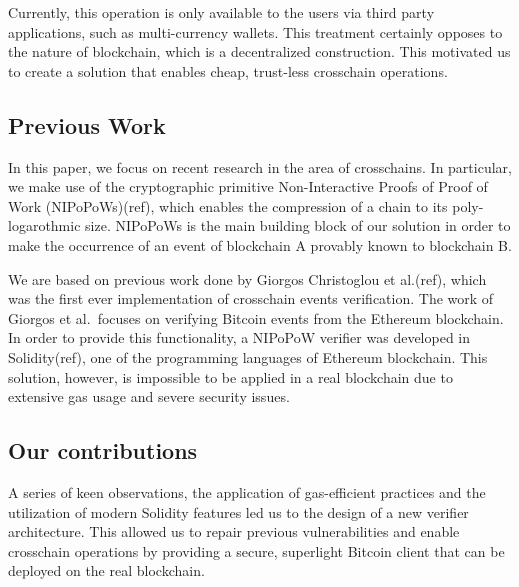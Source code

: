 Currently, this operation is only available to the users via third party
applications, such as multi-currency wallets. This treatment certainly
opposes to the nature of blockchain, which is a decentralized construction.
This motivated us to create a solution that enables cheap, trust-less
crosschain operations.

\subsection{Previous Work}

In this paper, we focus on recent research in the area of crosschains.
In particular, we make use of the cryptographic primitive
Non-Interactive Proofs of Proof of Work (NIPoPoWs)(ref), which enables
the compression of a chain to its poly-logarothmic size. NIPoPoWs is the
main building block of our solution in order to make the occurrence of
an event of blockchain A provably known to blockchain B.

We are based on previous work done by Giorgos Christoglou et al.(ref),
which was the first ever implementation of crosschain events
verification. The work of Giorgos et al.\ focuses on verifying Bitcoin
events from the Ethereum blockchain. In order to provide this
functionality, a NIPoPoW verifier was developed in Solidity(ref), one of
the programming languages of Ethereum blockchain. This solution,
however, is impossible to be applied in a real blockchain due to
extensive gas usage and severe security issues.


\subsection{Our contributions}

A series of keen observations, the application of gas-efficient
practices and the utilization of modern Solidity features led us to the
design of a new verifier architecture. This allowed us to repair
previous vulnerabilities and enable crosschain operations by providing a
secure, superlight Bitcoin client that can be deployed on the real
blockchain.

